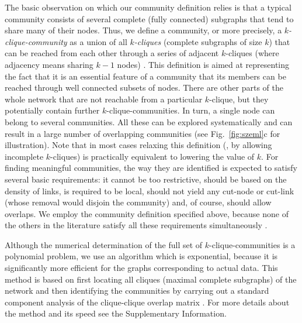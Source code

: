 \documentclass[11pt,a4paper]{article}
\begin{document}
The basic observation on which our community definition relies is that
a typical community consists of several complete (fully connected)
subgraphs that tend to share many of their nodes.
Thus, we define a community, or more precisely, a
\emph{$k$-clique-community} as a union of all \emph{$k$-cliques}
(complete subgraphs of size $k$) that can be reached from each other
through a series of adjacent $k$-cliques (where adjacency means sharing
$k-1$ nodes)
\cite{everett-connections,short-cycles,clique-percolation}.
This definition is aimed at representing the fact that it is an
essential feature of a community that its members can be reached
through well connected subsets of nodes. There are other parts of the
whole network that are not reachable from a particular
$k$-clique, but they potentially contain further
$k$-clique-communities. In turn, a single node can belong to several
communities.
All these can be explored systematically and can
result in a large number of overlapping communities
(see Fig.~\ref{fig:szeml}c for illustration).
{\corr
Note that in most cases relaxing this definition (\eg, by allowing
incomplete $k$-cliques) is practically equivalent to lowering the value
of $k$.}
{\corr
For finding meaningful communities, the way they are 
identified is expected to satisfy several
basic requirements:
%
it cannot be too restrictive,
%
should be based on the density of links,
%
is required to be local,
%
should not
yield any cut-node or cut-link
(whose removal would disjoin the community)
%
and, of course, should allow overlaps.
%
We employ the
community definition specified above,
because none of the others in the literature
satisfy all these requirements simultaneously
\cite{everett-connections,kosub}.
}

{\corr
Although the numerical determination of the full set of
$k$-clique-communities is a polynomial problem, 
we use an algorithm which is exponential, because it
is significantly more efficient for the
graphs corresponding to actual data. This
}
method is based on first locating
all cliques (maximal complete subgraphs) of the network and then
identifying the communities by carrying out a
standard component analysis of the
clique-clique overlap matrix
\cite{everett-connections}.
For more details about the method and its speed see the Supplementary
Information.
\end{document}
